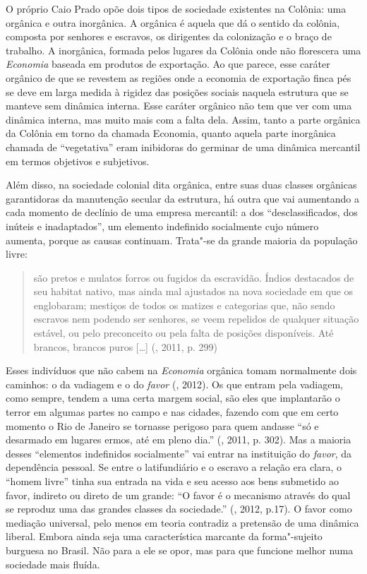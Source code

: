 O próprio Caio Prado opõe dois tipos de sociedade existentes na Colônia:
uma orgânica e outra inorgânica. A orgânica é aquela que dá o sentido da
colônia, composta por senhores e escravos, os dirigentes da colonização
e o braço de trabalho. A inorgânica, formada pelos lugares da Colônia
onde não florescera uma \emph{Economia} baseada em produtos de
exportação. Ao que parece, esse caráter orgânico de que se revestem as
regiões onde a economia de exportação finca pés se deve em larga medida
à rigidez das posições sociais naquela estrutura que se manteve sem
dinâmica interna. Esse caráter orgânico não tem que ver com uma dinâmica
interna, mas muito mais com a falta dela. Assim, tanto a parte orgânica
da Colônia em torno da chamada Economia, quanto aquela parte inorgânica
chamada de ``vegetativa'' eram inibidoras do germinar de uma dinâmica
mercantil em termos objetivos e subjetivos.

Além disso, na sociedade colonial dita orgânica, entre suas duas classes
orgânicas garantidoras da manutenção secular da estrutura, há outra que
vai aumentando a cada momento de declínio de uma empresa mercantil: a
dos ``desclassificados, dos inúteis e inadaptados'', um elemento
indefinido socialmente cujo número aumenta, porque as causas continuam.
Trata"-se da grande maioria da população livre:

\begin{quote}
são pretos e mulatos forros ou fugidos da escravidão. Índios destacados
de seu habitat nativo, mas ainda mal ajustados na nova sociedade em que
os englobaram; mestiços de todos os matizes e categorias que, não sendo
escravos nem podendo ser senhores, se veem repelidos de qualquer
situação estável, ou pelo preconceito ou pela falta de posições
disponíveis. Até brancos, brancos puros [\ldots{}] (, 2011, p.
299)
\end{quote}

Esses
indivíduos que não cabem na \emph{Economia} orgânica tomam normalmente
dois caminhos: o da vadiagem e o do \emph{favor} (, 2012). Os que
entram pela vadiagem, como sempre, tendem a uma certa margem social, são
eles que implantarão o terror em algumas partes no campo e nas cidades,
fazendo com que em certo momento o Rio de Janeiro se tornasse perigoso
para quem andasse ``só e desarmado em lugares ermos, até em pleno dia.''
(, 2011, p. 302). Mas a maioria desses ``elementos indefinidos
socialmente'' vai entrar na instituição do \emph{favor}, da dependência
pessoal. Se entre o latifundiário e o escravo a relação era clara, o
``homem livre'' tinha sua entrada na vida e seu acesso aos bens
submetido ao favor, indireto ou direto de um grande: ``O favor é o
mecanismo através do qual se reproduz uma das grandes classes da
sociedade.'' (, 2012, p.17). O favor como mediação universal,
pelo menos em teoria contradiz a pretensão de uma dinâmica liberal.
Embora ainda seja uma característica marcante da forma"-sujeito burguesa
no Brasil. Não para a ele se opor, mas para que funcione melhor numa
sociedade mais fluída.

